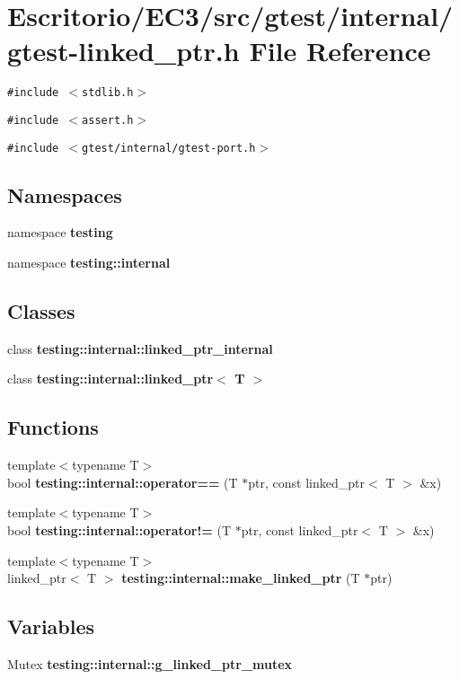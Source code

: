\section{Escritorio/EC3/src/gtest/internal/gtest-linked\_\-ptr.h File Reference}
\label{gtest-linked__ptr_8h}
{\tt \#include $<$stdlib.h$>$}\par
{\tt \#include $<$assert.h$>$}\par
{\tt \#include $<$gtest/internal/gtest-port.h$>$}\par
\subsection*{Namespaces}
\begin{CompactItemize}
\item 
namespace {\bf testing}
\item 
namespace {\bf testing::internal}
\end{CompactItemize}
\subsection*{Classes}
\begin{CompactItemize}
\item 
class {\bf testing::internal::linked\_\-ptr\_\-internal}
\item 
class {\bf testing::internal::linked\_\-ptr$<$ T $>$}
\end{CompactItemize}
\subsection*{Functions}
\begin{CompactItemize}
\item 
{\footnotesize template$<$typename T$>$ }\\bool {\bf testing::internal::operator==} (T $\ast$ptr, const linked\_\-ptr$<$ T $>$ \&x)
\item 
{\footnotesize template$<$typename T$>$ }\\bool {\bf testing::internal::operator!=} (T $\ast$ptr, const linked\_\-ptr$<$ T $>$ \&x)
\item 
{\footnotesize template$<$typename T$>$ }\\linked\_\-ptr$<$ T $>$ {\bf testing::internal::make\_\-linked\_\-ptr} (T $\ast$ptr)
\end{CompactItemize}
\subsection*{Variables}
\begin{CompactItemize}
\item 
Mutex {\bf testing::internal::g\_\-linked\_\-ptr\_\-mutex}
\end{CompactItemize}
